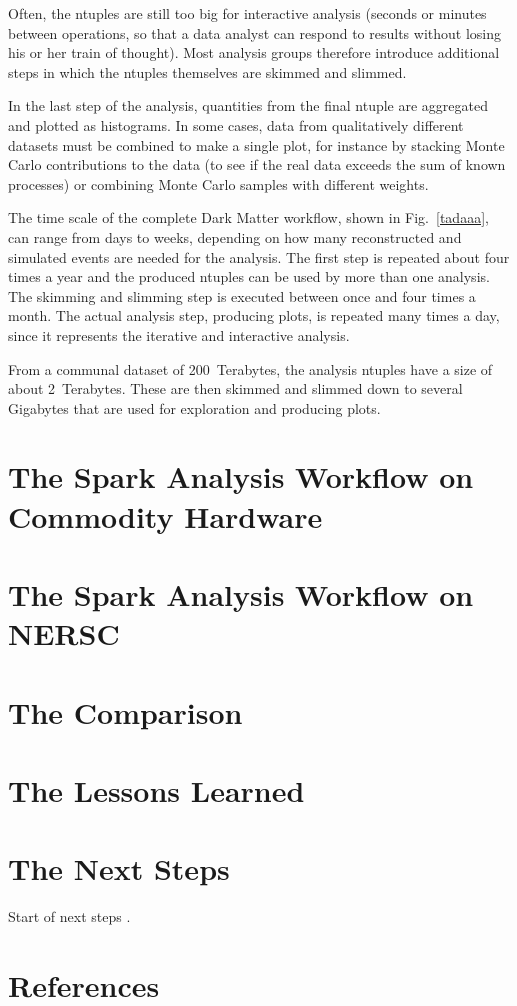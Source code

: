 \documentclass[a4paper]{jpconf}
\begin{document}
Often, the ntuples are still too big for interactive analysis (seconds or minutes between operations, so that a data analyst can respond to results without losing his or her train of thought). Most analysis groups therefore introduce additional steps in which the ntuples themselves are skimmed and slimmed.

In the last step of the analysis, quantities from the final ntuple are aggregated and plotted as histograms. In some cases, data from qualitatively different datasets must be combined to make a single plot, for instance by stacking Monte Carlo contributions to the data (to see if the real data exceeds the sum of known processes) or combining Monte Carlo samples with different weights.

The time scale of the complete Dark Matter workflow, shown in Fig.~\ref{tadaaa}, can range from days to weeks, depending on how many reconstructed and simulated events are needed for the analysis. The first step is repeated about four times a year and the produced ntuples can be used by more than one analysis. The skimming and slimming step is executed between once and four times a month. The actual analysis step, producing plots, is repeated many times a day, since it represents the iterative and interactive analysis.

From a communal dataset of 200~Terabytes, the analysis ntuples have a size of about 2~Terabytes. These are then skimmed and slimmed down to several Gigabytes that are used for exploration and producing plots.

\section{The Spark Analysis Workflow on Commodity Hardware}

\section{The Spark Analysis Workflow on NERSC}

\section{The Comparison}

\section{The Lessons Learned}

\section{The Next Steps}
Start of next steps \cite{ex1}.

\section*{References}

\end{document}
